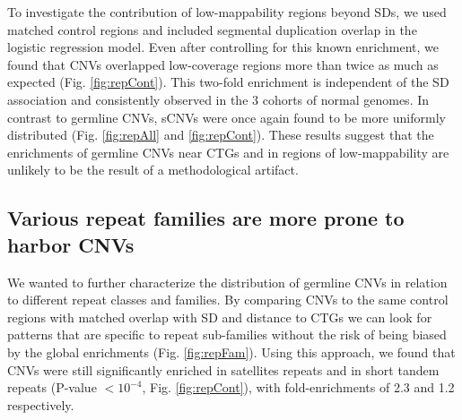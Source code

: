To investigate the contribution of low-mappability regions beyond SDs, we used matched control regions and included segmental duplication overlap in the logistic regression model.
Even after controlling for this known enrichment, we found that CNVs overlapped low-coverage regions more than twice as much as expected (Fig. \ref{fig:repCont}).
This two-fold enrichment is independent of the SD association and consistently observed in the 3 cohorts of normal genomes.
In contrast to germline CNVs, sCNVs were once again found to be more uniformly distributed (Fig. \ref{fig:repAll} and \ref{fig:repCont}).
These results suggest that the enrichments of germline CNVs near CTGs and in regions of low-mappability are unlikely to be the result of a methodological artifact.

\subsection*{Various repeat families are more prone to harbor CNVs}

We wanted to further characterize the distribution of germline CNVs in relation to different repeat classes and families.
By comparing CNVs to the same control regions with matched overlap with SD and distance to CTGs we can look for patterns that are specific to repeat sub-families without the risk of being biased by the global enrichments (Fig. \ref{fig:repFam}).
Using this approach, we found that CNVs were still significantly enriched in satellites repeats and in short tandem repeats (P-value $<10^{-4}$, Fig. \ref{fig:repCont}), with fold-enrichments of 2.3 and 1.2 respectively.

